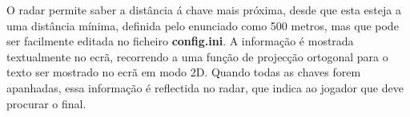 O radar permite saber a distância á chave mais próxima, desde que esta esteja a uma distância mínima, definida pelo enunciado como 500 metros, mas que pode ser facilmente editada no ficheiro \textbf{config.ini}.
A informação é mostrada textualmente no ecrã, recorrendo a uma função de projecção ortogonal para o texto ser mostrado no ecrã em modo 2D.
Quando todas as chaves forem apanhadas, essa informação é reflectida no radar, que indica ao jogador que deve procurar o final.
